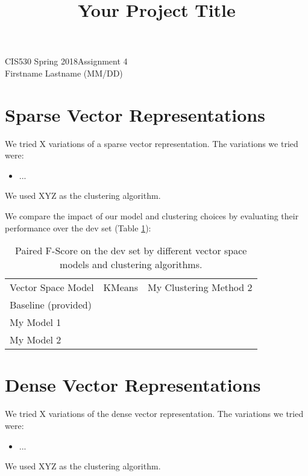 \documentclass[12pt]{article}
\title{Your Project Title}
\begin{document}
CIS530 Spring 2018\hfill Assignment 4\\
Firstname Lastname (MM/DD)

\hrulefill

\section{Sparse Vector Representations}

We tried X variations of a sparse vector representation. The variations we tried were:

\begin{itemize}
\item ...
\end{itemize}

We used XYZ as the clustering algorithm. 

We compare the impact of our model and clustering choices by evaluating their performance over the dev set (Table \ref{tab:sparseresults}):

\begin{table}[]
\centering
\begin{tabular}{lll}
Vector Space Model  & KMeans & My Clustering Method 2 \\
Baseline (provided) &        &                        \\
My Model 1          &        &                        \\
My Model 2          &        &                       
\end{tabular}
\caption{Paired F-Score on the dev set by different vector space models and clustering algorithms.}
\label{tab:sparseresults}
\end{table}

\section{Dense Vector Representations}

We tried X variations of the dense vector representation. The variations we tried were:

\begin{itemize}
\item ...
\end{itemize}

We used XYZ as the clustering algorithm. 
\end{document}
